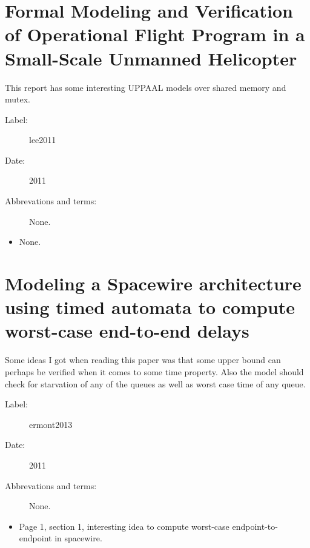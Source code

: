 \section{Formal Modeling and Verification of Operational Flight Program in a
Small-Scale Unmanned Helicopter}
This report has some interesting UPPAAL models over shared memory and mutex.

\begin{description}
    \item[Label:] lee2011 \cite{lee2011}
    \item[Date:] 2011
    \item[Abbrevations and terms:] None.
\end{description}

\begin{itemize}
    \item None.
\end{itemize}

\section{Modeling a Spacewire architecture using timed automata to compute
worst-case end-to-end delays}
Some ideas I got when reading this paper was that some upper bound can perhaps
be verified when it comes to some time property. Also the model should check
for starvation of any of the queues as well as worst case time of any queue.

\begin{description}
    \item[Label:] ermont2013 \cite{ermont2013}
    \item[Date:] 2011
    \item[Abbrevations and terms:] None.
\end{description}

\begin{itemize}
    \item Page 1, section 1, interesting idea to compute worst-case
        endpoint-to-endpoint in spacewire.
\end{itemize}

